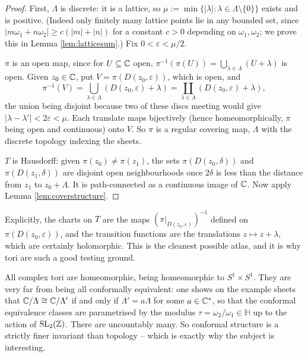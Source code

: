 \documentclass[a4paper]{scrartcl}
\newcommand{\Hp}{\mathbb{H}}
\newcommand{\Cs}{\C^*}
\begin{document}
\begin{proof}
	First, $\Lambda$ is discrete: it is a lattice, so $\mu := \min\{|\lambda| : \lambda \in
	\Lambda \setminus \{0\}\}$ exists and is positive. (Indeed only finitely many lattice
	points lie in any bounded set, since $|m\omega_1 + n\omega_2| \geq c(|m| + |n|)$ for a
	constant $c > 0$ depending on $\omega_1, \omega_2$; we prove this in Lemma
	\ref{lem:latticesum}.) Fix $0 < \varepsilon < \mu/2$.

	$\pi$ is an open map, since for $U \subseteq \mathbb{C}$ open,
	$\pi^{-1}(\pi(U)) = \bigcup_{\lambda \in \Lambda}(U + \lambda)$ is open. Given
	$z_0 \in \mathbb{C}$, put $V = \pi(D(z_0,\varepsilon))$, which is open, and
	$$
	\pi^{-1}(V) = \bigcup_{\lambda\in\Lambda} (D(z_0,\varepsilon) + \lambda)
	= \coprod_{\lambda \in \Lambda} (D(z_0,\varepsilon)+\lambda),
	$$
	the union being disjoint because two of these discs meeting would give
	$|\lambda - \lambda'| < 2\varepsilon < \mu$. Each translate maps bijectively
	(hence homeomorphically, $\pi$ being open and continuous) onto $V$. So $\pi$ is a
	regular covering map, $\Lambda$ with the discrete topology indexing the sheets.

	$T$ is Hausdorff: given $\pi(z_0) \neq \pi(z_1)$, the sets $\pi(D(z_0,\delta))$ and
	$\pi(D(z_1,\delta))$ are disjoint open neighbourhoods once $2\delta$ is less than the
	distance from $z_1$ to $z_0 + \Lambda$. It is path-connected as a continuous image of
	$\mathbb{C}$. Now apply Lemma \ref{lem:coverstructure}.
\end{proof}

Explicitly, the charts on $T$ are the maps $(\pi|_{D(z_0,\varepsilon)})^{-1}$ defined on
$\pi(D(z_0,\varepsilon))$, and the transition functions are the translations
$z \mapsto z + \lambda$, which are certainly holomorphic. This is the cleanest possible
atlas, and it is why tori are such a good testing ground.

\begin{remark}
	All complex tori are homeomorphic, being homeomorphic to $S^1 \times S^1$. They are
	very far from being all conformally equivalent: one shows on the example sheets that
	$\mathbb{C}/\Lambda \cong \mathbb{C}/\Lambda'$ if and only if $\Lambda' = a\Lambda$ for some
	$a \in \Cs$, so that the conformal equivalence classes are parametrised by the modulus
	$\tau = \omega_2/\omega_1 \in \Hp$ up to the action of $\operatorname{SL}_2(\mathbb{Z})$. There
	are uncountably many. So conformal structure is a strictly finer invariant than
	topology -- which is exactly why the subject is interesting.
\end{remark}
\end{document}
